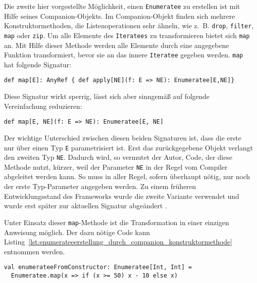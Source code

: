 Die zweite hier vorgestellte Möglichkeit, einen \lstinline|Enumeratee| zu erstellen ist mit Hilfe seines Companion-Objekts.
Im Companion-Objekt finden sich mehrere Konstruktormethoden, die Listenoperationen sehr ähneln, wie z.~B. \lstinline|drop|, \lstinline|filter|, \lstinline|map| oder \lstinline|zip|.
Um alle Elemente des \lstinline|Iteratees| zu transformieren bietet sich \lstinline|map| an.
Mit Hilfe dieser Methode werden alle Elemente durch eine angegebene Funktion transformiert, bevor sie an das innere \lstinline|Iteratee| gegeben werden.
\lstinline|map| hat folgende Signatur:
\begin{lstlisting}[caption=Die Signatur von Enumeratee.map, label=lst:die_signatur_von_enumeratee_map]
def map[E]: AnyRef { def apply[NE](f: E => NE): Enumeratee[E,NE]}
\end{lstlisting}
Diese Signatur wirkt sperrig, lässt sich aber sinngemäß auf folgende Vereinfachung reduzieren:
\begin{lstlisting}[caption=Die vereinfachte Signatur von Enumeratee.map, label=lst:die_vereinfachte_signatur_von_enumeratee_map]
def map[E, NE](f: E => NE): Enumeratee[E, NE]
\end{lstlisting}

Der wichtige Unterschied zwischen diesen beiden Signaturen ist, dass die erste nur über einen Typ \lstinline|E| parametrisiert ist.
Erst das zurückgegebene Objekt verlangt den zweiten Typ \lstinline|NE|.
Dadurch wird, so vermutet der Autor, Code, der diese Methode nutzt, kürzer, weil der Parameter \lstinline|NE| in der Regel vom Compiler abgeleitet werden kann.
So muss in aller Regel, sofern überhaupt nötig, nur noch der erste Typ-Parameter angegeben werden.
Zu einem früheren Entwicklungsstand des Frameworks wurde die zweite Variante verwendet und wurde erst später zur aktuellen Signatur abgeändert \cite[vgl.][]{play_enumeratee_map_signatur}.

Unter Einsatz dieser \lstinline|map|-Methode ist die Transformation in einer einzigen Anweisung möglich.
Der dazu nötige Code kann Listing~\ref{lst:enumerateeerstellung_durch_companion_konstruktormethode} entnommen werden.

\begin{lstlisting}[caption=Erstellung eines Enumeratees durch die map-Konstruktormethode, label=lst:enumerateeerstellung_durch_companion_konstruktormethode]
val enumerateeFromConstructor: Enumeratee[Int, Int] =
  Enumeratee.map(x => if (x >= 50) x - 10 else x)
\end{lstlisting}

